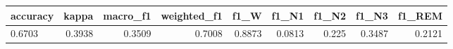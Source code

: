 \begin{tabular}{lrrrrrrrr}
\hline
accuracy & kappa & macro_f1 & weighted_f1 & f1_W & f1_N1 & f1_N2 & f1_N3 & f1_REM \\
\hline
0.6703 & 0.3938 & 0.3509 & 0.7008 & 0.8873 & 0.0813 & 0.225 & 0.3487 & 0.2121 \\
\hline
\end{tabular}
